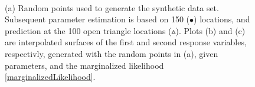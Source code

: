 \documentclass[a4paper]{article}
\begin{document}
\begin{figure}[h!]
  \begin{center}
    \\
  \end{center}
  \caption{(a) Random points used to generate the synthetic data set.  Subsequent parameter estimation is based on 150 ($\bullet$) locations, and prediction at the 100 open triangle locations ($\vartriangle$). Plots (b) and (c) are interpolated surfaces of the first and second response variables, respectivly,  generated with the random points in (a), given parameters, and the marginalized likelihood \ref{marginalizedLikelihood}.}
  \label{Syn}
\end{figure}
\end{document}
